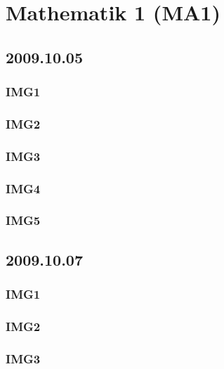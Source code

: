 \chapter{Mathematik 1 (MA1)}
\section{2009.10.05}
\subsection{IMG1}


\subsection{IMG2}


\subsection{IMG3}


\subsection{IMG4}


\subsection{IMG5}


\section{2009.10.07}
\subsection{IMG1}


\subsection{IMG2}


\subsection{IMG3}



